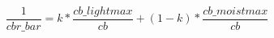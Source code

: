 \documentclass{article}
\begin{document}
\[ \frac{1}{cbr\_bar} = k * \frac{cb\_lightmax}{cb} + (1 - k) * \frac{cb\_moistmax}{cb} \]
\pagebreak
\end{document}
